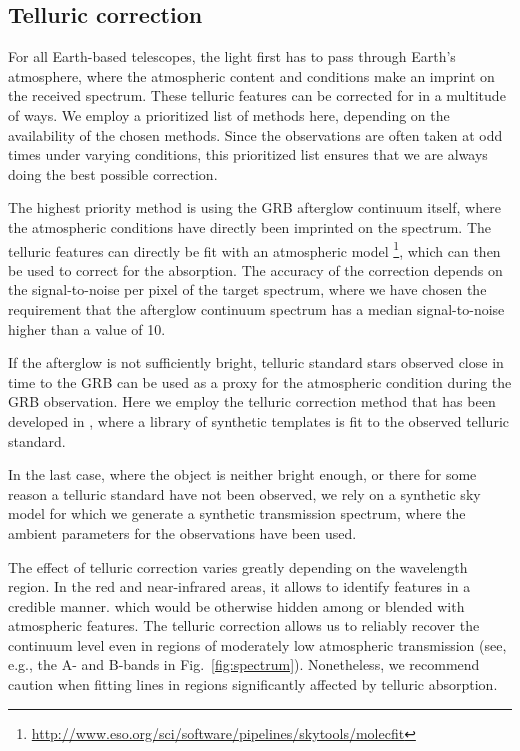\documentclass[longauth]{aa}    %
\begin{document}
\subsection{Telluric correction} \label{tell_corr}

For all Earth-based telescopes, the light first has to pass through Earth's
atmosphere, where the atmospheric content and conditions make an imprint on the
received spectrum. These telluric features can be corrected for in a multitude
of ways. We employ a prioritized list of methods here, depending on the
availability of the chosen methods. Since the observations are often taken at
odd times under varying conditions, this prioritized list ensures that we are
always doing the best possible correction.

The highest priority method is using the GRB afterglow continuum itself, where
the atmospheric conditions have directly been imprinted on the spectrum. The
telluric features can directly be fit with an atmospheric model \citep[\texttt{Molecfit};][]{Smette2015,
	Kausch2015}\footnote{\url{http://www.eso.org/sci/software/pipelines/skytools/molecfit}}, which can then be used to correct for the absorption. The accuracy of the correction depends on the signal-to-noise per pixel of the target spectrum, where we have chosen the requirement that the afterglow continuum spectrum has a median signal-to-noise higher than a value of 10.

If the afterglow is not sufficiently bright, telluric standard stars observed
close in time to the GRB can be used as a proxy for the atmospheric
condition during the GRB observation. Here we employ the telluric correction
method that has been developed in \citet{Selsing2015}, where a library of
synthetic templates is fit to the observed telluric standard.

In the last case, where the object is neither bright enough, or there for some
reason a telluric standard have not been observed, we rely on a synthetic sky
model \citep{Noll2012, Jones2013} for which we generate a
synthetic transmission spectrum, where the ambient parameters for the
observations have been used.

The effect of telluric correction varies greatly depending on the wavelength
region. In the red and near-infrared areas, it allows to identify features in a
credible manner. which would be otherwise hidden among or blended with
atmospheric features. The telluric correction allows us to reliably recover the
continuum level even in regions of moderately low atmospheric transmission (see,
e.g., the A- and B-bands in Fig.~\ref{fig:spectrum}). Nonetheless, we recommend
caution when fitting lines in regions significantly affected by telluric
absorption.
\end{document}
